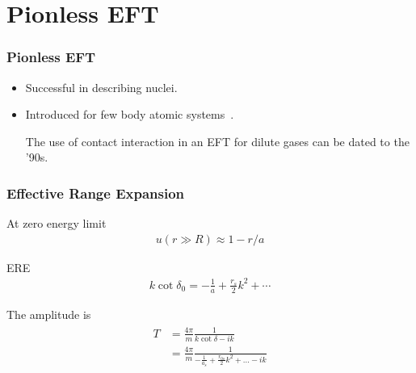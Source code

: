 \section{Pionless EFT}

\begin{frame}
	\frametitle{Pionless EFT}

	\begin{itemize}
		\item Successful in describing nuclei. \setlength{\itemsep}{20mm}
		\item Introduced for few body atomic systems~\parencite[see review by][]{Platter2009}.
		
		The use of contact interaction in an EFT for dilute gases can be dated to the '90s.
	\end{itemize}

\end{frame}

\begin{frame}
	\frametitle{Effective Range Expansion}

	At zero energy limit
	\begin{align*}
		u(r\gg R)\approx 1-r/a
	\end{align*}

	\begin{block}{ERE}
		\begin{align}
			k \cot \delta_{0}=-\frac{1}{a}+\frac{r_{s}}{2} k^{2}+\cdots
		\end{align}
	\end{block}
	The amplitude is
	\begin{align}
		\begin{aligned}
			T & =\frac{4 \pi}{m} \frac{1}{k \cot \delta-i k}                                   \\
			  & =\frac{4 \pi}{m} \frac{1}{-\frac{1}{a_{s}}+\frac{r_{0s} }{2} k^{2}+\ldots-i k}
		\end{aligned}
	\end{align}

\end{frame}

